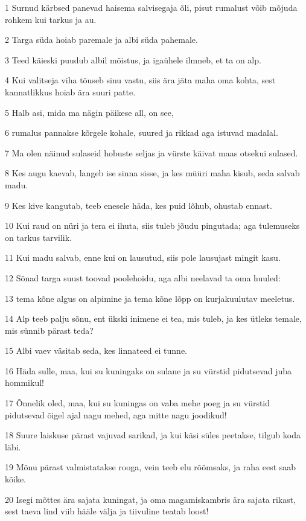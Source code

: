 \par 1 Surnud kärbsed panevad haisema salvisegaja õli, pisut rumalust võib mõjuda rohkem kui tarkus ja au.
\par 2 Targa süda hoiab paremale ja albi süda pahemale.
\par 3 Teed käieski puudub albil mõistus, ja igaühele ilmneb, et ta on alp.
\par 4 Kui valitseja viha tõuseb sinu vastu, siis ära jäta maha oma kohta, sest kannatlikkus hoiab ära suuri patte.
\par 5 Halb asi, mida ma nägin päikese all, on see,
\par 6 rumalus pannakse kõrgele kohale, suured ja rikkad aga istuvad madalal.
\par 7 Ma olen näinud sulaseid hobuste seljas ja vürste käivat maas otsekui sulased.
\par 8 Kes augu kaevab, langeb ise sinna sisse, ja kes müüri maha kisub, seda salvab madu.
\par 9 Kes kive kangutab, teeb enesele häda, kes puid lõhub, ohustab ennast.
\par 10 Kui raud on nüri ja tera ei ihuta, siis tuleb jõudu pingutada; aga tulemuseks on tarkus tarvilik.
\par 11 Kui madu salvab, enne kui on lausutud, siis pole lausujast mingit kasu.
\par 12 Sõnad targa suust toovad poolehoidu, aga albi neelavad ta oma huuled:
\par 13 tema kõne algus on alpimine ja tema kõne lõpp on kurjakuulutav meeletus.
\par 14 Alp teeb palju sõnu, ent ükski inimene ei tea, mis tuleb, ja kes ütleks temale, mis sünnib pärast teda?
\par 15 Albi vaev väsitab seda, kes linnateed ei tunne.
\par 16 Häda sulle, maa, kui su kuningaks on sulane ja su vürstid pidutsevad juba hommikul!
\par 17 Õnnelik oled, maa, kui su kuningas on vaba mehe poeg ja su vürstid pidutsevad õigel ajal nagu mehed, aga mitte nagu joodikud!
\par 18 Suure laiskuse pärast vajuvad sarikad, ja kui käsi süles peetakse, tilgub koda läbi.
\par 19 Mõnu pärast valmistatakse rooga, vein teeb elu rõõmsaks, ja raha eest saab kõike.
\par 20 Isegi mõttes ära sajata kuningat, ja oma magamiskambris ära sajata rikast, sest taeva lind viib hääle välja ja tiivuline teatab loost!

